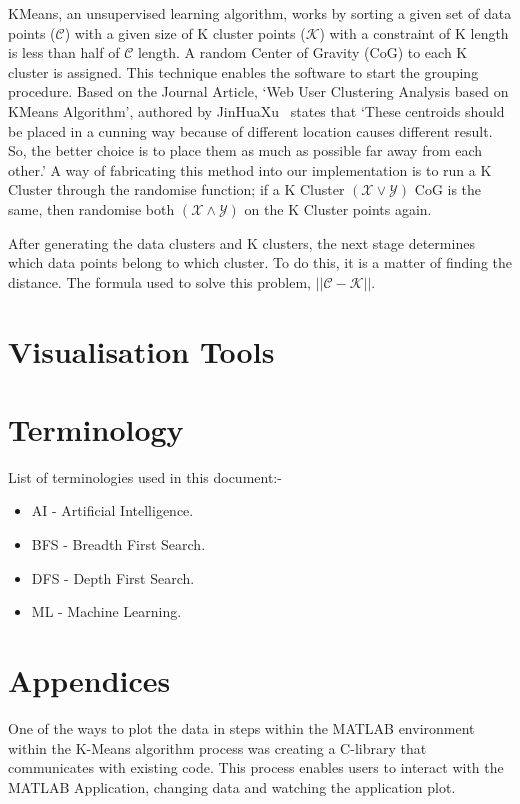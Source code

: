 \documentclass[conference]{IEEEtran}
\begin{document}
      KMeans, an unsupervised learning algorithm, works by sorting a given set of data points ($\mathcal{C}$) with a given size of K cluster points ($\mathcal{K}$) with a constraint of K length is less than half of $\mathcal{C}$ length. A random Center of Gravity (CoG) to each K cluster is assigned. This technique enables the software to start the grouping procedure. Based on the Journal Article, `Web User Clustering Analysis based on KMeans Algorithm', authored by JinHuaXu~\cite{jinhuaxu_web_2010} states that `These centroids should be placed in a cunning way because of different location causes different result. So, the better choice is to place them as much as possible far away from each other.' A way of fabricating this method into our implementation is to run a K Cluster through the randomise function; if a K Cluster $(\mathcal{X} \vee \mathcal{Y})$ CoG is the same, then randomise both $(\mathcal{X} \wedge  \mathcal{Y})$ on the K Cluster points again.

      After generating the data clusters and K clusters, the next stage determines which data points belong to which cluster. To do this, it is a matter of finding the distance. The formula used to solve this problem, $\left||\mathcal{C} - \mathcal{K}\right||$.
    \section{Visualisation Tools}

    \section{Terminology}
      List of terminologies used in this document:-
      \begin{itemize}
        \item AI - Artificial Intelligence.
        \item BFS - Breadth First Search.
        \item DFS - Depth First Search.
        \item ML - Machine Learning.
      \end{itemize}

    \section{Appendices}
      One of the ways to plot the data in steps within the MATLAB environment within the K-Means algorithm process was creating a C-library that communicates with existing code. This process enables users to interact with the MATLAB Application, changing data and watching the application plot. 
      
\end{document}
